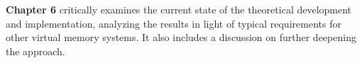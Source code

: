 \textbf{Chapter 6} critically examines the current state of the theoretical development and implementation, analyzing the results in light of typical requirements for other virtual memory systems. It also includes a discussion on further deepening the approach.











